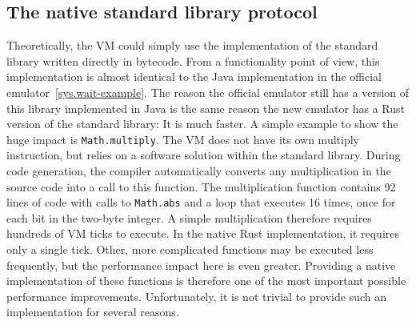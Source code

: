 \subsection{The native standard library protocol} \label{jack-stdlib-in-rust}
Theoretically, the VM could simply use the implementation of the standard library written directly in bytecode.
From a functionality point of view, this implementation is almost identical to the Java implementation in the official emulator~\ref{sys.wait-example}.
The reason the official emulator still has a version of this library implemented in Java is the same reason the new emulator has a Rust version of the standard library:
It is much faster.
A simple example to show the huge impact is \verb+Math.multiply+.
The VM does not have its own multiply instruction, but relies on a software solution within the standard library.
During code generation, the compiler automatically converts any multiplication in the source code into a call to this function.
The multiplication function contains 92 lines of code with calls to \verb+Math.abs+ and a loop that executes 16 times, once for each bit in the two-byte integer.
A simple multiplication therefore requires hundreds of VM ticks to execute.
In the native Rust implementation, it requires only a single tick.
Other, more complicated functions may be executed less frequently, but the performance impact here is even greater.
Providing a native implementation of these functions is therefore one of the most important possible performance improvements.
Unfortunately, it is not trivial to provide such an implementation for several reasons.

